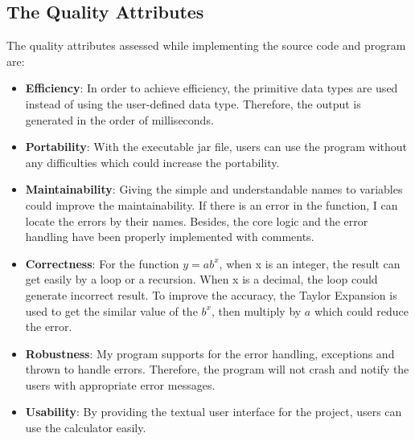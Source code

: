 \documentclass[11pt]{article}
\begin{document}
\subsection{The Quality Attributes}
The quality attributes assessed while implementing the source code and program are:
\begin{center}
    \begin{itemize}
        \item \textbf{Efficiency}: In order to achieve efficiency, the primitive data types are used instead of using the user-defined data type. Therefore, the output is generated in the order of milliseconds.
        \item \textbf{Portability}: With the executable jar file, users can use the program without any difficulties which could increase the portability.
        \item \textbf{Maintainability}: Giving the simple and understandable names to variables could improve the maintainability. If there is an error in the function, I can locate the errors by their names. Besides, the core logic and the error handling have been properly implemented with comments.
        \item \textbf{Correctness}: For the function $y = ab^x$, when x is an integer, the result can get easily by a loop or a recursion. When x is a decimal, the loop could generate incorrect result. To improve the accuracy, the Taylor Expansion is used to get the similar value of the $b^x$, then multiply by $a$ which could reduce the error.
        \item \textbf{Robustness}: My program supports for the error handling, exceptions and thrown to handle errors. Therefore, the program will not crash and notify the users with appropriate error messages.
        \item \textbf{Usability}: By providing the textual user interface for the project, users can use the calculator easily.
    \end{itemize}
\end{center}
\end{document}

